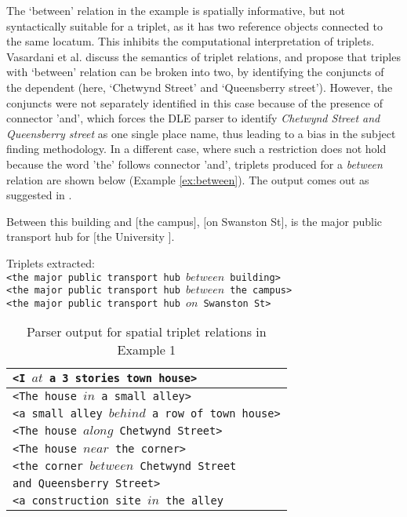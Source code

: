 \documentclass{acm_proc_article-sp}
\begin{document}
The `between' relation in the example is spatially informative, but not syntactically suitable for a triplet, as it has two reference objects connected to the same locatum. This inhibits the computational interpretation of triplets. Vasardani et al. \cite{maria:descriptions} discuss the semantics of triplet relations, and propose that triples with `between' relation can be broken into two, by identifying the conjuncts of the dependent (here, `Chetwynd Street' and `Queensberry street'). However, the conjuncts were not separately identified in this case because of the presence of connector 'and', which forces the DLE parser to identify 
\textit{Chetwynd Street and Queensberry street} as one single place name, thus leading to a bias in the subject finding methodology. In a different case, where such a restriction does not hold because the word 'the' follows connector 'and', triplets produced for a \textit{between} relation are shown below (Example \ref{ex:between}). The output comes out as suggested in \cite{maria:descriptions}.
\begin{example}
\label{ex:between}
Between this building and $[$the campus$]$, $[$on Swanston St$]$, is the major public transport hub for $[$the University $]$.
\end{example}
Triplets extracted:\\
\texttt{<the major public transport hub $between$  building>} \\
\texttt{<the major public transport hub $between$  the campus>} \\
\texttt{<the major public transport hub $on$ Swanston St>}
\begin{table}
\begin{tabular}{|l|}
\hline
\texttt{<I $at$ a 3 stories town house>}  \\ \hline
\texttt{<The house $in$ a small alley>} \\ \hline
\texttt{<a small alley $behind$ a row of town house>}\\ \hline
\texttt{<The house $along$ Chetwynd Street>}\\ \hline
\texttt{<The house $near$ the corner>}\\ \hline
\texttt{<the corner $between$ Chetwynd Street} \\
\texttt{and Queensberry Street>}\\ \hline
\texttt{<a construction site $in$ the alley}\\ \hline
\end{tabular}
\caption{Parser output for spatial triplet relations in Example 1}
\label{table:ex1}
\end{table}
\end{document}
